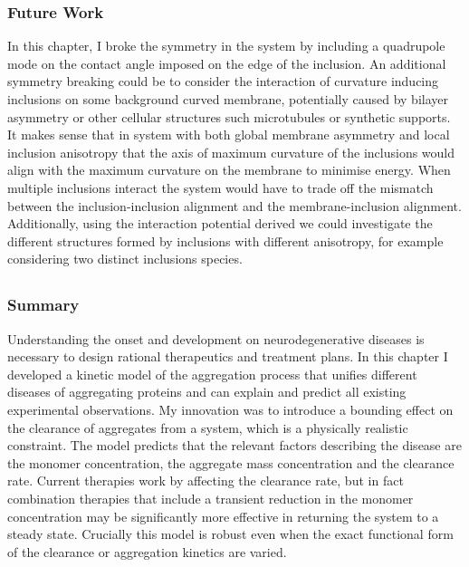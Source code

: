 \subsubsection{Future Work}

In this chapter, I broke the symmetry in the system by including a quadrupole mode on the contact angle imposed on the edge of the inclusion. An additional symmetry breaking could be to consider the interaction of curvature inducing inclusions on some background curved membrane, potentially caused by bilayer asymmetry or other cellular structures such microtubules or synthetic supports. It makes sense that in system with both global membrane asymmetry and local inclusion anisotropy that the axis of maximum curvature of the inclusions would align with the maximum curvature on the membrane to minimise energy. When multiple inclusions interact the system would have to trade off the mismatch between the inclusion-inclusion alignment and the membrane-inclusion alignment. Additionally, using the interaction potential derived we could investigate the different structures formed by inclusions with different anisotropy, for example considering two distinct inclusions species.

\subsection{\chaggregation}

\subsubsection{Summary}
Understanding the onset and development on neurodegenerative diseases is necessary to design rational therapeutics and treatment plans. In this chapter I developed a kinetic model of the aggregation process that unifies different diseases of aggregating proteins and can explain and predict all existing experimental observations. My innovation was to introduce a bounding effect on the clearance of aggregates from a system, which is a physically realistic constraint. The model predicts that the relevant factors describing the disease are the monomer concentration, the aggregate mass concentration and the clearance rate. Current therapies work by affecting the clearance rate, but in fact combination therapies that include a transient reduction in the monomer concentration may be significantly more effective in returning the system to a steady state. Crucially this model is robust even when the exact functional form of the clearance or aggregation kinetics are varied.



